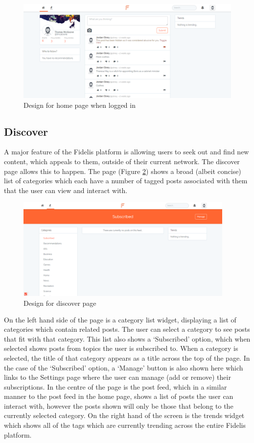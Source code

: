\begin{figure}[H]
\centering
\includegraphics[height=2in]{Images/Design/home_authorised}
\caption{Design for home page when logged in}
\label{fig:home_authorised}
\end{figure}

\subsection{Discover}
A major feature of the Fidelis platform is allowing users to seek out and find new content, which appeals to them, outside of their current network. The discover page allows this to happen. The page (Figure \ref{fig:discover_page}) shows a broad (albeit concise) list of categories which each have a number of tagged posts associated with them that the user can view and interact with.

\begin{figure}[H]
\centering
\includegraphics[height=2in]{Images/Design/discover}
\caption{Design for discover page}
\label{fig:discover_page}
\end{figure}

On the left hand side of the page is a category list widget, displaying a list of categories which contain related posts. The user can select a category to see posts that fit with that category. This list also shows a `Subscribed' option, which when selected shows posts from topics the user is subscribed to. When a category is selected, the title of that category appears as a title across the top of the page. In the case of the `Subscribed' option, a `Manage' button is also shown here which links to the Settings page where the user can manage (add or remove) their subscriptions. In the centre of the page is the post feed, which in a similar manner to the post feed in the home page, shows a list of posts the user can interact with, however the posts shown will only be those that belong to the currently selected category. On the right hand of the screen is the trends widget which shows all of the tags which are currently trending across the entire Fidelis platform.

